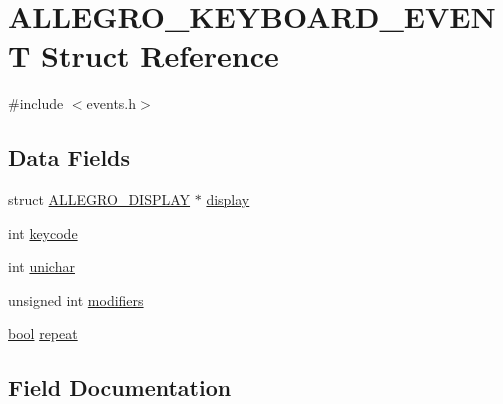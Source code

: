 \hypertarget{struct_a_l_l_e_g_r_o___k_e_y_b_o_a_r_d___e_v_e_n_t}{}\section{A\+L\+L\+E\+G\+R\+O\+\_\+\+K\+E\+Y\+B\+O\+A\+R\+D\+\_\+\+E\+V\+E\+NT Struct Reference}
\label{struct_a_l_l_e_g_r_o___k_e_y_b_o_a_r_d___e_v_e_n_t}


{\ttfamily \#include $<$events.\+h$>$}

\subsection*{Data Fields}
\begin{DoxyCompactItemize}
\item 
struct \hyperlink{display_8h_a7516185aa39c086f4bc62bd4bf5858bf}{A\+L\+L\+E\+G\+R\+O\+\_\+\+D\+I\+S\+P\+L\+AY} $\ast$ \hyperlink{struct_a_l_l_e_g_r_o___k_e_y_b_o_a_r_d___e_v_e_n_t_a2169a84d9e939fb320c7d80ae469e730}{display}
\item 
int \hyperlink{struct_a_l_l_e_g_r_o___k_e_y_b_o_a_r_d___e_v_e_n_t_ad461b91a5fdc57f9bd166078144a2593}{keycode}
\item 
int \hyperlink{struct_a_l_l_e_g_r_o___k_e_y_b_o_a_r_d___e_v_e_n_t_a86c1c0df3a658ef138fbba95897ef380}{unichar}
\item 
unsigned int \hyperlink{struct_a_l_l_e_g_r_o___k_e_y_b_o_a_r_d___e_v_e_n_t_a4bf766234fcbde82f68bb2bd5b201727}{modifiers}
\item 
\hyperlink{astdbool_8h_abb452686968e48b67397da5f97445f5b}{bool} \hyperlink{struct_a_l_l_e_g_r_o___k_e_y_b_o_a_r_d___e_v_e_n_t_a7ba5587bce9a5cf88ec7b005087a780d}{repeat}
\end{DoxyCompactItemize}


\subsection{Field Documentation}
\mbox{\label{struct_a_l_l_e_g_r_o___k_e_y_b_o_a_r_d___e_v_e_n_t_a2169a84d9e939fb320c7d80ae469e730}} 
